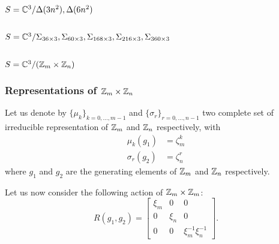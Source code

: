 \documentclass[a4paper,10pt]{article}
\begin{document}
    \subsection{$S=\mathbb{C}^3/\Delta(3n^2),\Delta(6n^2)$}

    \subsection{$S=\mathbb{C}^3/\Sigma_{36\times 3},\Sigma_{60\times 3},\Sigma_{168\times 3},\Sigma_{216\times 3},\Sigma_{360\times 3}$}


    \subsection{$S=\mathbb{C}^3/(\mathbb{Z}_m\times\mathbb{Z}_n)$}

        \subsubsection{Representations of $\mathbb{Z}_m\times\mathbb{Z}_n$}

           Let us denote by $\{\mu_k\}_{k=0,\dots,m-1}$ and $\{\sigma_r\}_{r=0,\dots,n-1}$ two complete set of irreducible representation of $\mathbb{Z}_m$ and $\mathbb{Z}_n$ respectively, with
           \begin{align}
               \mu_k(g_1)&=\zeta^k_m\\
               \sigma_r(g_2)&=\zeta^r_n
           \end{align}
           where $g_1$ and $g_2$ are the generating elements of $\mathbb{Z}_m$ and $\mathbb{Z}_n$ respectively.

           Let us now consider the following action of $\mathbb{Z}_m\times\mathbb{Z}_m$:
           \begin{equation}
                R(g_1,g_2)=
               \begin{bmatrix}
                   \xi_m & 0 & 0 \\
                   0 & \xi_n & 0 \\
                   0 & 0 & \xi^{-1}_m\xi^{-1}_n
               \end{bmatrix}.
           \end{equation}
           
\end{document}
